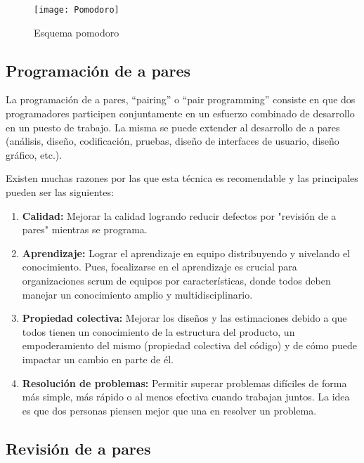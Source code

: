 \begin{figure}[h]
  \centering
  \texttt{[image: Pomodoro]}
  \caption{Esquema pomodoro}
  \centering
  \label{fig:Pomodoro} %
\end{figure}

\subsection{Programación de a pares}

La programación de a pares, “pairing” o “pair programming” consiste en que dos programadores participen conjuntamente en un esfuerzo combinado de desarrollo en un puesto de trabajo. La misma se puede extender al desarrollo de a pares (análisis, diseño, codificación, pruebas, diseño de interfaces de usuario, diseño gráfico, etc.).

Existen muchas razones por las que esta técnica es recomendable y las principales pueden ser las siguientes:

\begin{enumerate}

\item \textbf{Calidad:} Mejorar la calidad logrando reducir defectos por "revisión de a pares" mientras se programa.

\item \textbf{Aprendizaje:} Lograr el aprendizaje en equipo distribuyendo y nivelando el conocimiento. Pues, focalizarse en el aprendizaje es crucial para organizaciones scrum de equipos por características, donde todos deben manejar un conocimiento amplio y multidisciplinario. 

\item \textbf{Propiedad colectiva:}
Mejorar los diseños y las estimaciones debido a que todos tienen un conocimiento de la estructura del producto, un empoderamiento del mismo (propiedad colectiva del código) y de cómo puede impactar un cambio en parte de él.

\item \textbf{Resolución de problemas:} Permitir superar problemas difíciles de forma más simple, más rápido o al menos efectiva cuando trabajan juntos. La idea es que dos personas piensen mejor que una en resolver un problema.

\end{enumerate}

\subsection{Revisión de a pares}

